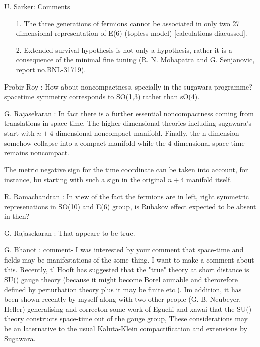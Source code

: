 \noindent
U. Sarker: Comments
\begin{itemize}
\item[1.] The three generations of fermions cannot be associated in only two 27 dimensional representation of E(6) (topless model) [calculations diacussed].
\item[2.] Extended survival hypothesis is not only a hypothesis, rather it is a consequence of the minimal fine tuning (R. N. Mohapatra and G. Senjanovic, report no.BNL-31719).
\end{itemize}

\vspace{0.2cm}

\noindent
Probir Roy : How about noncompactness, specially in the sugawara programme? spacetime symmetry corresponds to SO(1,3) rather than sO(4). 

\vspace{0.2cm}
\noindent
G. Rajasekaran : In fact there is a further essential noncompactness coming from translations in space-time. The higher dimensional theories including sugawara's start with $n+4$ dimensional noncompact manifold. Finally, the n-dimension somehow collapse into a compact manifold while the 4 dimensional space-time remains noncompact.

The metric negative sign for the time coordinate can be taken into account, for instance, bu starting with such a sign in the original $n+4$ manifold itself.

\vspace{0.2cm}
\noindent
R. Ramachandran : In view of the fact the fermions are in left, right symmetric represenations in SO(10) and E(6) group, is Rubakov effect expected to be absent in then?

\vspace{0.2cm}
\noindent
G. Rajasekaran : That appeare to be true.


\vspace{0.2cm}
\noindent
G. Bhanot : comment- I was interested by your comment that space-time and fields may be manifestations of the some thing. I want to make a comment about this. Recently, t' Hooft has suggested that the "true" theory at short distance is SU() gauge theory (because it might become Borel aumable and therorefore defined by perturbation theory plus it may be finite etc.). Im addition, it has been shown recently by myself along with two other people (G. B. Neubeyer, Heller) generalising and correcton some work of Eguchi and xawai that the SU() theory constructs space-time out of the gauge group, These considerations may be an laternative to the usual Kaluta-Klein compactification and extensions by Sugawara.  


